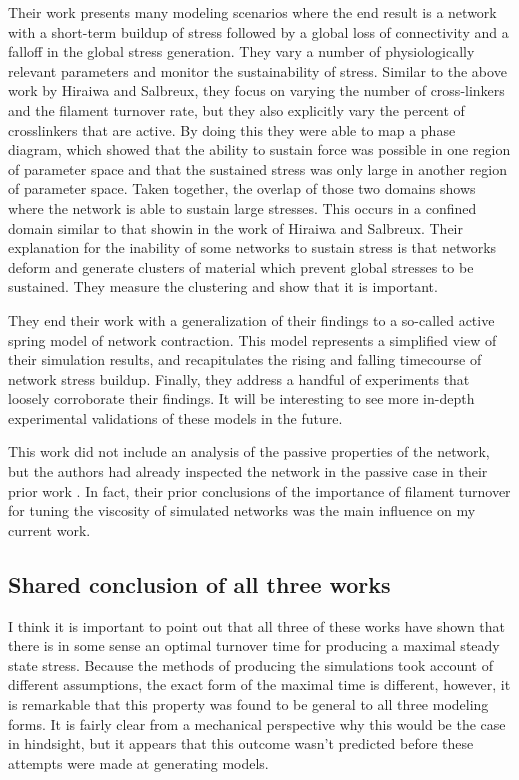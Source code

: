 Their work presents many modeling scenarios where the end result is a network with a short-term buildup of stress followed by a global loss of connectivity and a falloff in the global stress generation.  They vary a number of physiologically relevant parameters and monitor the sustainability of stress.  Similar to the above work by Hiraiwa and Salbreux, they focus on varying the number of cross-linkers and the filament turnover rate, but they also explicitly vary the percent of crosslinkers that are active.  By doing this they were able to map a phase diagram, which showed that the ability to sustain force was possible in one region of parameter space and that the sustained stress was only large in another region of parameter space.  Taken together, the overlap of those two domains shows where the network is able to sustain large stresses.  This occurs in a confined domain similar to that showin in the work of Hiraiwa and Salbreux. Their explanation for the inability of some networks to sustain stress is that networks deform and generate clusters of material which prevent global stresses to be sustained.  They measure the clustering and show that it is important. 

They end their work with a generalization of their findings to a so-called active spring model of network contraction.  This model represents a simplified view of their simulation results, and recapitulates the rising and falling timecourse of network stress buildup.  Finally, they address a handful of experiments that loosely corroborate their findings.  It will be interesting to see more in-depth experimental validations of these models in the future.

This work did not include an analysis of the passive properties of the network, but the authors had already inspected the network in the passive case in their prior work \cite{Kim2014526}.  In fact, their prior conclusions of the importance of filament turnover for tuning the viscosity of simulated networks was the main influence on my current work.

\subsection{Shared conclusion of all three works}
I think it is important to point out that all three of these works have shown that there is in some sense an optimal turnover time for producing a maximal steady state stress.  Because the methods of producing the simulations took account of different assumptions, the exact form of the maximal time is different, however, it is remarkable that this property was found to be general to all three modeling forms.  It is fairly clear from a mechanical perspective why this would be the case in hindsight, but it appears that this outcome wasn't predicted before these attempts were made at generating models.

